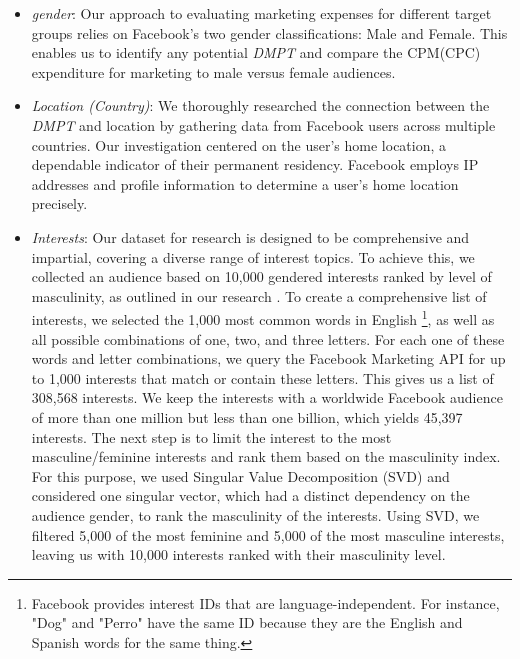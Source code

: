 \documentclass[twocolumn]{bmcart}\usepackage{lineno}
\begin{document}
\begin{itemize}
    \item \emph{gender}: Our approach to evaluating marketing expenses for different target groups relies on Facebook's two gender classifications: Male and Female. This enables us to identify any potential \emph{DMPT} and compare the CPM(CPC) expenditure for marketing to male versus female audiences.
 \item \emph{Location (Country)}: We thoroughly researched the connection between the \emph{DMPT} and location by gathering data from Facebook users across multiple countries. Our investigation centered on the user's home location, a dependable indicator of their permanent residency. Facebook employs IP addresses and profile information to determine a user's home location precisely. 
    \item \emph{Interests}:\color{blue} Our dataset for research is designed to be comprehensive and impartial, covering a diverse range of interest topics. To achieve this, we collected an audience based on 10,000 gendered interests ranked by level of masculinity, as outlined in our research \cite{cuevas2021gender}. To create a comprehensive list of interests, we selected the 1,000 most common words in English \footnote{Facebook provides interest IDs that are language-independent. For instance, "Dog" and "Perro" have the same ID because they are the English and Spanish words for the same thing.}, as well as all possible combinations of one, two, and three letters. For each one of these words and letter combinations, we query the Facebook Marketing API for up to 1,000 interests that match or contain these letters. This gives us a list of 308,568 interests. We keep the interests with a worldwide Facebook audience of more than one million but less than one billion, which yields 45,397 interests. The next step is to limit the interest to the most masculine/feminine interests and rank them based on the masculinity index. For this purpose, we used Singular Value Decomposition (SVD) and considered one singular vector, which had a distinct dependency on the audience gender, to rank the masculinity of the interests. Using SVD, we filtered 5,000 of the most feminine and 5,000 of the most masculine interests, leaving us with 10,000 interests ranked with their masculinity level. \color{black}  
\end{itemize}
\end{document}

